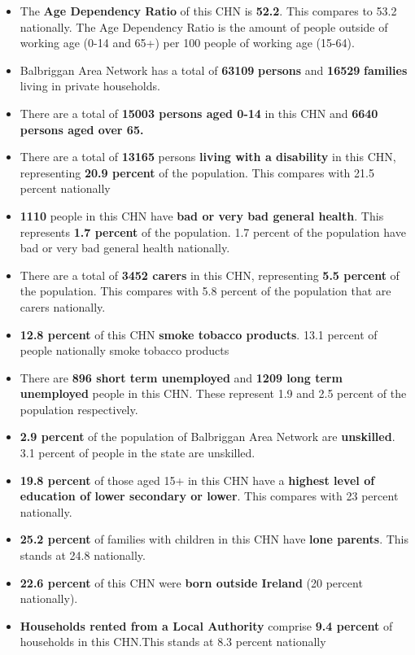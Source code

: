 \documentclass{article}
\begin{document}
\begin{itemize}

\item The \textbf{Age Dependency Ratio} of this CHN is  \textbf{52.2}. This compares to 53.2 nationally. The Age Dependency Ratio is the amount of people outside of working age (0-14 and 65+) per 100 people of working age (15-64). 

\item Balbriggan Area Network has a total of \textbf{\num{63109}} \textbf{persons} and  \textbf{\num{16529}} \textbf{families} living in private households.

\item There are a total of \textbf{\num{15003} persons aged 0-14} in this CHN and \textbf{\num{6640} persons aged over 65.} 

\item There are a total of \textbf{\num{13165}} persons \textbf{living with a disability} in this CHN, representing \textbf{20.9 percent} of the population. This compares with  21.5 percent nationally

\item \textbf{\num{1110}} people in this CHN have \textbf{bad or very bad general health}. This represents \textbf{1.7 percent} of the population. 1.7 percent of the population have bad or very bad general health nationally. 

\item There are a total of \textbf{\num{3452} carers} in this CHN, representing \textbf{5.5 percent} of the population. This compares with 5.8 percent of the population that are carers nationally. 

\item \textbf{12.8 percent} of this CHN \textbf{smoke tobacco products}. 13.1 percent of people nationally smoke tobacco products

\item There are \textbf{\num{896} short term unemployed} and \textbf{\num{1209} long term unemployed} people in this CHN. These represent 1.9 and 2.5 percent of the population respectively.

\item  \textbf{2.9 percent} of the population of Balbriggan Area Network are \textbf{unskilled}. 3.1 percent of people in the state are unskilled.

\item \textbf{19.8 percent} of those aged 15+ in this CHN have a \textbf{highest level of education of lower secondary or lower}. This compares with 23 percent nationally. 

\item \textbf{25.2 percent} of families with children in this CHN have \textbf{lone parents}. This stands at 24.8 nationally.

\item \textbf{22.6 percent} of this CHN were \textbf{born outside Ireland} (20 percent nationally).

\item \textbf{Households rented from a Local Authority} comprise \textbf{9.4 percent} of households in this CHN.This stands at 8.3 percent nationally

\end{itemize}
\end{document}
